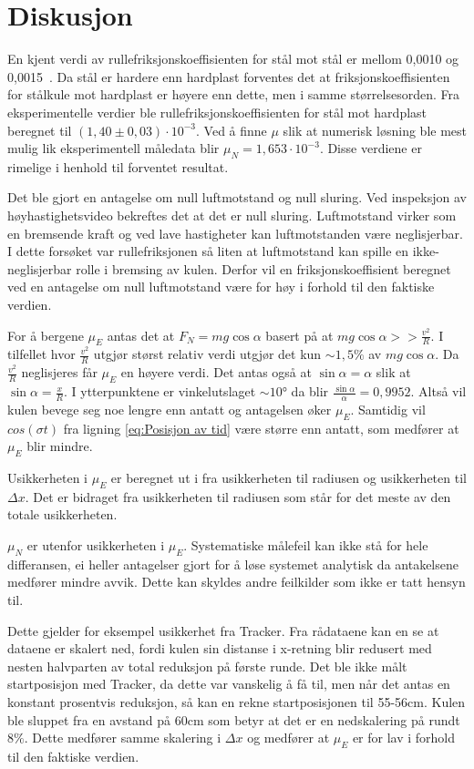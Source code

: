 \section{Diskusjon}
En kjent verdi av rullefriksjonskoeffisienten for stål mot stål er mellom 0,0010 og 0,0015~\cite{friksjonskoeffisienter}. Da stål er hardere enn hardplast forventes det at friksjonskoeffisienten for stålkule mot hardplast er høyere enn dette, men i samme størrelsesorden. Fra eksperimentelle verdier ble rullefriksjonskoeffisienten for stål mot hardplast beregnet til $(1,40 \pm 0,03)\cdot10^{-3}$.
Ved å finne $\mu$ slik at numerisk løsning ble mest mulig lik eksperimentell måledata blir $\mu_N = 1,653 \cdot 10^{-3}$. Disse verdiene er rimelige i henhold til forventet resultat. 

Det ble gjort en antagelse om null luftmotstand og null sluring. Ved inspeksjon av høyhastighetsvideo bekreftes det at det er null sluring. Luftmotstand virker som en bremsende kraft og ved lave hastigheter kan luftmotstanden være neglisjerbar. I dette forsøket var rullefriksjonen så liten at luftmotstand kan spille en ikke-neglisjerbar rolle i bremsing av kulen. Derfor vil en friksjonskoeffisient beregnet ved en antagelse om null luftmotstand være for høy i forhold til den faktiske verdien. 

For å bergene $\mu_E$ antas det at $F_N = mg\cos{\alpha}$ basert på at $mg\cos{\alpha} >> \frac{v^2}{R}$. I tilfellet hvor $\frac{v^2}{R}$ utgjør størst relativ verdi utgjør det kun $\sim 1,5 \%$ av $mg\cos{\alpha}$. Da $\frac{v^2}{R}$ neglisjeres får $\mu_E$ en høyere verdi. Det antas også at $\sin{\alpha} = \alpha$ slik at $\sin{\alpha} = \frac{x}{R}$. I ytterpunktene er vinkelutslaget $\sim \ang{10}$ da blir $\frac{\sin{\alpha}}{\alpha} = 0,9952$. Altså vil kulen bevege seg noe lengre enn antatt og antagelsen øker $\mu_E$. Samtidig vil $cos(\sigma t)$ fra ligning \eqref{eq:Posisjon av tid} være større enn antatt, som medfører at $\mu_E$ blir mindre.

Usikkerheten i $\mu_E$ er beregnet ut i fra usikkerheten til radiusen og usikkerheten til $\Delta x$. Det er bidraget fra usikkerheten til radiusen som står for det meste av den totale usikkerheten.

$\mu_N$ er utenfor usikkerheten i $\mu_E$.
Systematiske målefeil kan ikke stå for hele differansen, ei heller antagelser gjort for å løse systemet analytisk da antakelsene medfører mindre avvik. Dette kan skyldes andre feilkilder som ikke er tatt hensyn til.

Dette gjelder for eksempel usikkerhet fra Tracker. Fra rådataene kan en se at dataene er skalert ned, fordi kulen sin distanse i x-retning blir redusert med nesten halvparten av total reduksjon på første runde. Det ble ikke målt startposisjon med Tracker, da dette var vanskelig å få til, men når det antas en konstant prosentvis reduksjon, så kan en rekne startposisjonen til 55-56cm. Kulen ble sluppet fra en avstand på 60cm som betyr at det er en nedskalering på rundt 8$\%$. Dette medfører samme skalering i $\Delta x$ og medfører at $\mu_E$ er for lav i forhold til den faktiske verdien. %

